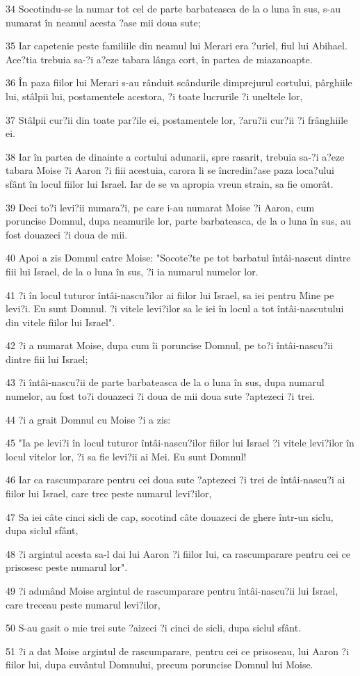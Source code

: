 \par 34 Socotindu-se la numar tot cel de parte barbateasca de la o luna în sus, s-au numarat în neamul acesta ?ase mii doua sute;
\par 35 Iar capetenie peste familiile din neamul lui Merari era ?uriel, fiul lui Abihael. Ace?tia trebuia sa-?i a?eze tabara lânga cort, în partea de miazanoapte.
\par 36 În paza fiilor lui Merari s-au rânduit scândurile dimprejurul cortului, pârghiile lui, stâlpii lui, postamentele acestora, ?i toate lucrurile ?i uneltele lor,
\par 37 Stâlpii cur?ii din toate par?ile ei, postamentele lor, ?aru?ii cur?ii ?i frânghiile ei.
\par 38 Iar în partea de dinainte a cortului adunarii, spre rasarit, trebuia sa-?i a?eze tabara Moise ?i Aaron ?i fiii acestuia, carora li se încredin?ase paza loca?ului sfânt în locul fiilor lui Israel. Iar de se va apropia vreun strain, sa fie omorât.
\par 39 Deci to?i levi?ii numara?i, pe care i-au numarat Moise ?i Aaron, cum poruncise Domnul, dupa neamurile lor, parte barbateasca, de la o luna în sus, au fost douazeci ?i doua de mii.
\par 40 Apoi a zis Domnul catre Moise: "Socote?te pe tot barbatul întâi-nascut dintre fiii lui Israel, de la o luna în sus, ?i ia numarul numelor lor.
\par 41 ?i în locul tuturor întâi-nascu?ilor ai fiilor lui Israel, sa iei pentru Mine pe levi?i. Eu sunt Domnul. ?i vitele levi?ilor sa le iei în locul a tot întâi-nascutului din vitele fiilor lui Israel".
\par 42 ?i a numarat Moise, dupa cum îi poruncise Domnul, pe to?i întâi-nascu?ii dintre fiii lui Israel;
\par 43 ?i întâi-nascu?ii de parte barbateasca de la o luna în sus, dupa numarul numelor, au fost to?i douazeci ?i doua de mii doua sute ?aptezeci ?i trei.
\par 44 ?i a grait Domnul cu Moise ?i a zis:
\par 45 "Ia pe levi?i în locul tuturor întâi-nascu?ilor fiilor lui Israel ?i vitele levi?ilor în locul vitelor lor, ?i sa fie levi?ii ai Mei. Eu sunt Domnul!
\par 46 Iar ca rascumparare pentru cei doua sute ?aptezeci ?i trei de întâi-nascu?i ai fiilor lui Israel, care trec peste numarul levi?ilor,
\par 47 Sa iei câte cinci sicli de cap, socotind câte douazeci de ghere într-un siclu, dupa siclul sfânt,
\par 48 ?i argintul acesta sa-l dai lui Aaron ?i fiilor lui, ca rascumparare pentru cei ce prisosesc peste numarul lor".
\par 49 ?i adunând Moise argintul de rascumparare pentru întâi-nascu?ii lui Israel, care treceau peste numarul levi?ilor,
\par 50 S-au gasit o mie trei sute ?aizeci ?i cinci de sicli, dupa siclul sfânt.
\par 51 ?i a dat Moise argintul de rascumparare, pentru cei ce prisoseau, lui Aaron ?i fiilor lui, dupa cuvântul Domnului, precum poruncise Domnul lui Moise.

